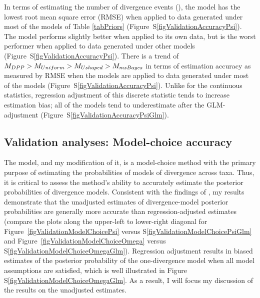 In terms of estimating the number of divergence events (\divTimeNum), the
\modelDPP model has the lowest root mean square error (RMSE) when applied
to data generated under most of the models of Table \ref{tabPriors}
(Figure~S\ref{figValidationAccuracyPsi}).
The \modelOld model performs slightly better when applied to its own data,
but is the worst performer when applied to data generated under other models
(Figure~S\ref{figValidationAccuracyPsi}).
There is a trend of $M_{DPP} > M_{Uniform} > M_{Ushaped} > M_{msBayes}$
in terms of estimation accuracy as measured by RMSE when the models are applied
to data generated under most of the models
(Figure~S\ref{figValidationAccuracyPsi}).
Unlike for the continuous statistics, regression adjustment of this discrete
statistic tends to increase estimation bias; all of the models tend to
underestimate \divTimeNum after the GLM-adjustment
(Figure~S\ref{figValidationAccuracyPsiGlm}).

\subsection{Validation analyses: Model-choice accuracy}
The \msb model, and my modification of it, is a model-choice method
with the primary purpose of estimating the probabilities of models
of divergence across taxa.
Thus, it is critical to assess the method's ability to accurately
estimate the posterior probabilities of divergence models.
Consistent with the findings of \cite{Oaks2012}, my results demonstrate that
the unadjusted estimates of divergence-model posterior probabilities are
generally more accurate than regression-adjusted estimates
(compare the plots along the upper-left to lower-right diagonal for
Figure~\ref{figValidationModelChoicePsi} versus
S\ref{figValidationModelChoicePsiGlm} and
Figure~\ref{figValidationModelChoiceOmega} versus
S\ref{figValidationModelChoiceOmegaGlm}).
Regression adjustment results in biased estimates of the posterior probability
of the one-divergence model when all model assumptions are satisfied, which is
well illustrated in Figure S\ref{figValidationModelChoiceOmegaGlm}.
As a result, I will focus my discussion of the results on the unadjusted
estimates.

